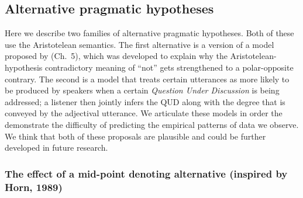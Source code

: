 \documentclass[floatsintext,doc]{apa6}
\begin{document}




\subsection{Alternative pragmatic hypotheses}

Here we describe two families of alternative pragmatic hypotheses. Both of these use the Aristotelean semantics. 
The first alternative is a version of a model proposed by  (Ch.~5), which was developed to explain why the Aristotelean-hypothesis contradictory meaning of ``not'' gets strengthened to a polar-opposite contrary.
The second is a model that treats certain utterances as more likely to be produced by speakers when a certain \emph{Question Under Discussion} is being addressed; a listener then jointly infers the QUD along with the degree that is conveyed by the adjectival utterance.
We articulate these models in order the demonstrate the difficulty of predicting the empirical patterns of data we observe. 
We think that both of these proposals are plausible and could be further developed in future research.


\subsubsection{The effect of a mid-point denoting alternative (inspired by Horn, 1989)}
\end{document}
